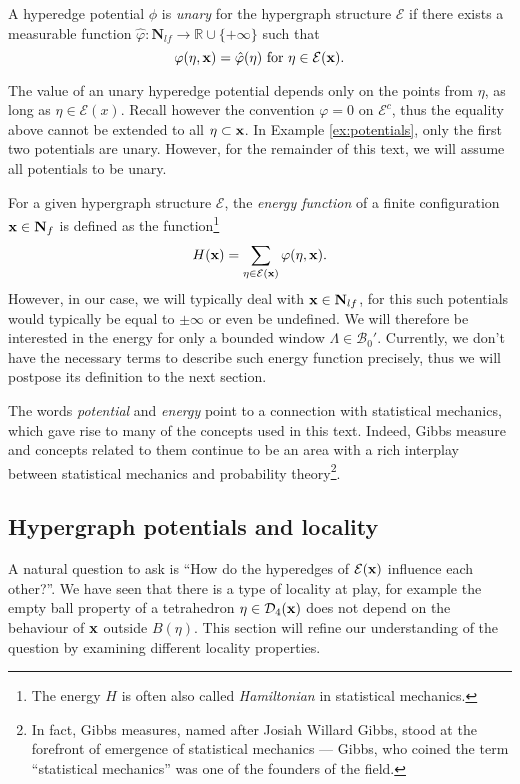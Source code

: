 \begin{definition}
	A hyperedge potential $\phi$ is \textit{unary} for the hypergraph structure $\mathcal E$ if there exists a measurable function $\hat\varphi:\mathbf N_{lf} \to \mathbb R \cup \{+\infty\}$ such that
	$$\varphi(\eta,{\mathbf{x}}) = \hat\varphi(\eta) \text{ for } \eta \in \mathcal E({\mathbf{x}}).$$
\end{definition}
The value of an unary hyperedge potential depends only on the points from $\eta$, as long as $\eta \in \mathcal E(x)$.  Recall however the convention $\varphi=0$ on $\mathcal E^c$, thus the equality above cannot be extended to all $\eta\subset {\mathbf{x}}$. 
In Example \ref{ex:potentials}, only the first two potentials are unary. However, for the remainder of this text, we will assume all potentials to be unary.\newline


For a given hypergraph structure $\mathcal E$, the \textit{energy function} of a finite configuration ${\mathbf{x}}\in \mathbf N_{f}$ is defined as the function\footnote{The energy $H$ is often also called \textit{Hamiltonian} in statistical mechanics.}
$$H({\mathbf{x}}) = \sum_{\eta \in \mathcal E({\mathbf{x}})} \varphi(\eta,{\mathbf{x}}).$$
However, in our case, we will typically deal with ${\mathbf{x}}\in \mathbf N_{lf}$, for this such potentials would typically be equal to $\pm \infty$ or even be undefined. We will therefore be interested in the energy for only a bounded window $\Lambda \in \mathcal B_0'$. Currently, we don't have the necessary terms to describe such energy function precisely, thus we will postpose its definition to the next section. 

The words \textit{potential} and \textit{energy} point to a connection with statistical mechanics, which gave rise to many of the concepts used in this text. Indeed, Gibbs measure and concepts related to them continue to be an area with a rich interplay between statistical mechanics and probability theory\footnote{In fact, Gibbs measures, named after Josiah Willard Gibbs, stood at the forefront of emergence of statistical mechanics --- Gibbs, who coined the term ``statistical mechanics'' was one of the founders of the field.}.




\subsection{Hypergraph potentials and locality}
A natural question to ask is ``How do the hyperedges of $\mathcal E({\mathbf{x}})$ influence each other?''. We have seen that there is a type of locality at play, for example  the empty ball property of a tetrahedron $\eta\in\mathcal D_4({\mathbf{x}})$ does not depend on the behaviour of ${\mathbf{x}}$ outside $B(\eta)$. This section will refine our understanding of the question by examining different locality properties.

